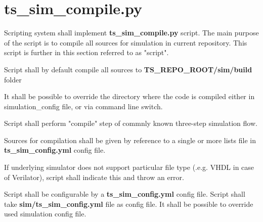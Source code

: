 \documentclass{tropic_design_spec}
\begin{document}
\section{ts_sim_compile.py}



    {Scripting system shall implement \textbf{ts_sim_compile.py} script. The main
     purpose of the script is to compile all sources for simulation in current 	
     repository. This script is further in this section referred to as "script".}


    {Script shall by default compile all sources to \textbf{TS_REPO_ROOT/sim/build}
     folder}

\ReqSubStart
        {It shall be possible to override the directory where the code is 
         compiled either in simulation_config file, or via command line switch.}
\ReqSubEnd


    {Script shall perform "compile" step of commnly known three-step simulation flow.}


    {Sources for compilation shall be given by reference to a single or more lists file 
     in \textbf{ts_sim_config.yml} config file.}%
		

    {If underlying simulator does not support particular file type (.e.g. VHDL in case of
     Verilator), script shall indicate this and throw an error.}%


    {Script shall be configurable by a \textbf{ts_sim_config.yml} config file.}%
\ReqSubStart
        {Script shall take \textbf{sim/ts_sim_config.yml} file as config file.}
        {It shall be possible to override used simulation config file.}
\ReqSubEnd
\end{document}
